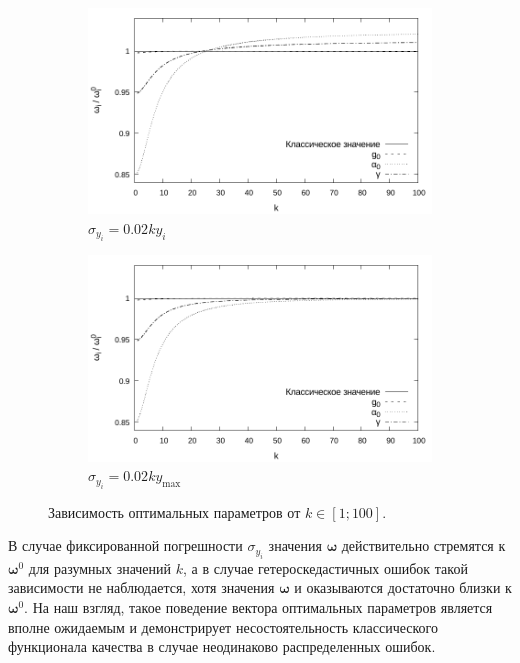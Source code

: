 \documentclass[tikz,10pt,a4paper]{article}
\newcommand{\bomega}{\boldsymbol{\omega}}
\begin{document}
\begin{figure}[h]
  \centering
  \begin{subfigure}[b]{0.5\textwidth}
    \includegraphics[width=\textwidth]{figs/levmar/convergence/convergence_1_100_0.01_yi.txt_bw.pdf}
	\caption{$\sigma_{y_i} = 0.02ky_i$}
	\label{fig:conv_varY_100}
  \end{subfigure}%
  \begin{subfigure}[b]{0.5\textwidth}
    \includegraphics[width=\textwidth]{figs/levmar/convergence/convergence_1_100_0.01_ymax.txt_bw.pdf}
	\caption{$\sigma_{y_i} = 0.02ky_{\max}$}
	\label{fig:conv_fixedY_100}
  \end{subfigure}
  \caption{Зависимость оптимальных параметров от $k \in [1; 100]$.}
  \label{fig:conv_varY}
\end{figure}

В случае фиксированной погрешности $\sigma_{y_i}$ значения $\bomega$
действительно стремятся к $\bomega^0$ для разумных значений $k$, а в случае
гетероскедастичных ошибок такой зависимости не наблюдается, хотя значения $\bomega$
и оказываются достаточно близки к $\bomega^0$. На наш взгляд, такое поведение
вектора оптимальных параметров является вполне ожидаемым и демонстрирует
несостоятельность классического функционала качества в случае неодинаково
распределенных ошибок.
\end{document}
